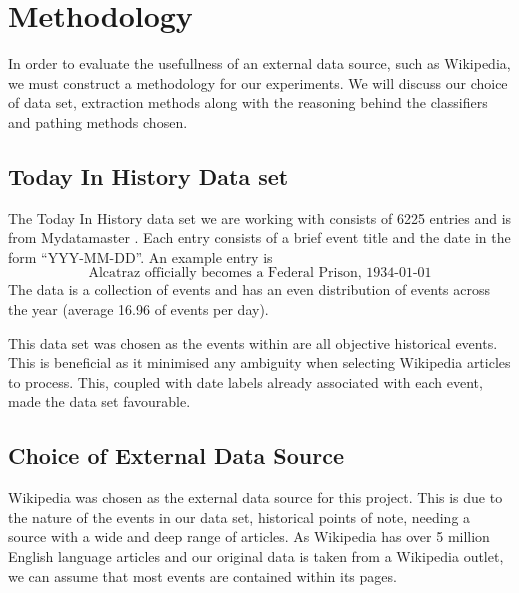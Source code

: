 \documentclass[bsc,frontabs,twoside,singlespacing,parskip,deptreport]{infthesis}     %
\begin{document}
\chapter{Methodology}
In order to evaluate the usefullness of an external data source, such as Wikipedia, we must construct a methodology
for our experiments. We will discuss our choice of data set, extraction methods along with the reasoning behind the
classifiers and pathing methods chosen.


\section{Today In History Data set}
The Today In History data set we are working with consists of 6225 entries and is from Mydatamaster \cite{mydatamaster}.
Each entry consists of a  brief event title and the date in the form ``YYY-MM-DD''.
An example entry is
\begin{equation}
  \text{Alcatraz officially becomes a Federal Prison, 1934-01-01}\nonumber
\end{equation}
The data is a collection of events and has
an even distribution of events across the year (average 16.96 of events per day).

This data set was chosen as the events within are all objective historical events. This is beneficial as it minimised
any ambiguity when selecting Wikipedia articles to process. This, coupled with date labels already associated with
each event, made the data set favourable.


\section{Choice of External Data Source}
Wikipedia was chosen as the external data source for this project.
This is due to the nature of the events in our data set, historical points of note,
needing a source with a wide and deep range of articles.
As Wikipedia has over 5 million English language articles \cite{wikipedaisize} and our original data
is taken from a Wikipedia outlet, we can assume
that most events are contained within its pages.
\end{document}
